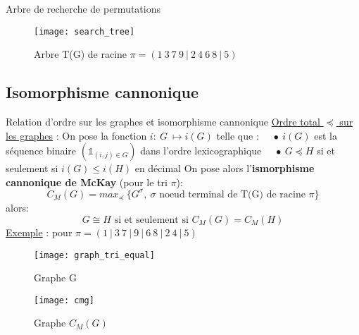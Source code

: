 \begin{frame}[noframenumbering]{Arbre de recherche de permutations}
    \begin{figure}[!htb]
        \texttt{[image: search\_tree]}
        \caption{\label{fig:Arbre T(G)} Arbre T(G) de racine $\pi=(1\ 3\ 7\ 9\ |\ 2\ 4\ 6\ 8\ |\ 5)$}
    \end{figure}
\end{frame}

\subsection{Isomorphisme cannonique}
\begin{frame}[noframenumbering]{Relation d'ordre sur les graphes et isomorphisme cannonique}
    \underline{Ordre total $\preceq$ sur les graphes} : \newline \newline
    On pose la fonction $i:\ G\ \longmapsto i(G)$ telle que : \newline
    $\quad \bullet \ i(G)$ est la séquence binaire $(\mathds{1}_{(i,j)\in G})$ dans l'ordre lexicographique \newline
    $\quad \bullet \ G \preceq H$ si et seulement si $i(G) \leq i(H)$ en décimal
    \newline \newline
    On pose alors l'\textbf{ismorphisme cannonique de McKay} (pour le tri $\pi$):
    \begin{equation}
        \boxed{C_M(G) = max_{\preceq}\ \lbrace G^{\sigma},\ \sigma \text{ noeud terminal de T(G) de racine } \pi \rbrace }
    \end{equation}
    alors:
    \begin{equation}
        \boxed{G \cong H \text{ si et seulement si } C_M(G) = C_M(H)}
    \end{equation}
    \newline
    \underline{Exemple} : pour $\pi = (1\ |\ 3\ 7\ |\ 9\ |\ 6\ 8\ |\ 2\ 4\ |\ 5)$
    \begin{multicols}{2}
        \begin{figure}[!htb]
            \centering
            \texttt{[image: graph\_tri\_equal]}
            \caption{\label{fig: Graphe G}Graphe G}
        \end{figure}
        \vspace*{1cm}
        \begin{figure}[!htb]
            \centering
            \texttt{[image: cmg]}
            \caption{\label{fig: Isomorphe G} Graphe $C_M(G)$}
        \end{figure}
    \end{multicols}
\end{frame}

